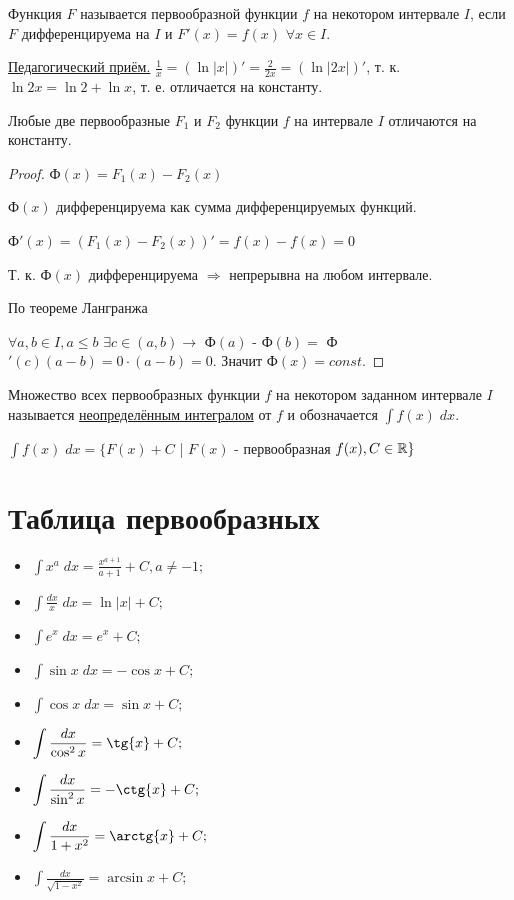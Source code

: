 	\begin{definition}
		Функция $F$ называется первообразной функции $f$ на некотором интервале $I$, если $F$ дифференцируема на $I$ и $F'(x) = f(x)$ $\forall x \in I$.
	\end{definition}
	
	\underline{Педагогический приём.}
	$\frac{1}{x} = (\ln{|x|})' = \frac{2}{2x} = (\ln{|2x|})'$, т. к. $\ln{2x} = \ln{2} + \ln{x}$, т. е. отличается на константу.
	
	\begin{lemma}
		Любые две первообразные $F_1$ и $F_2$ функции $f$ на интервале $I$ отличаются на константу.
	\end{lemma}
	
	\begin{proof}
		Ф$(x) = F_1(x) - F_2(x)$
		
		Ф$(x)$ дифференцируема как сумма дифференцируемых функций.
		
		Ф$'(x) = (F_1(x) - F_2(x))' = f(x) - f(x) = 0$
		
		Т. к. Ф$(x)$ дифференцируема $\Rightarrow$ непрерывна на любом интервале.
		
		По теореме Лангранжа 
		
		$\forall a, b \in I, a \leqslant b$ $\exists c \in (a, b) \rightarrow$ Ф$(a)$ - Ф$(b) = $ Ф$'(c)(a - b) = 0 \cdot (a - b) = 0.$ Значит Ф$(x) = const$.
	\end{proof}
	
	\begin{definition}
		Множество всех первообразных функции $f$ на некотором заданном интервале $I$ называется \underline{неопределённым интегралом} от $f$ и обозначается $\displaystyle\int f(x) \; dx$.
	\end{definition}
	
	$\displaystyle\int f(x) \; dx = \{F(x) + C$ | $F(x)$ - первообразная $f(x), C \in \mathbb R\}$
	
	\section{Таблица первообразных}
	\begin{itemize}
		\item $\displaystyle\int x^a \; dx = \frac{x^{a + 1}}{a + 1} + C, a \neq -1;$
		\item $\displaystyle\int \frac{dx}{x} \; dx = \ln{|x|} + C;$
		\item $\displaystyle\int e^x \; dx = e^x + C;$
		\item $\displaystyle\int \sin{x} \; dx = -\cos{x} + C;$
		\item $\displaystyle\int \cos{x} \; dx = \sin{x} + C;$
		\item $\displaystyle\int \frac{dx}{\cos^2{x}} = \tg{x} + C;$
		\item $\displaystyle\int \frac{dx}{\sin^2{x}} = -\ctg{x} + C;$
		\item $\displaystyle\int \frac{dx}{1 + x^2} = \arctg{x} + C;$
		\item $\displaystyle\int \frac{dx}{\sqrt{1 - x^2}} = \arcsin{x} + C;$
	\end{itemize}
	
